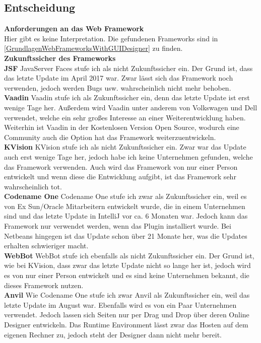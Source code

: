 \documentclass[ngerman]{article}
\begin{document}
    \subsection{Entscheidung}
    \textbf{Anforderungen an das Web Framework}\\
    Hier gibt es keine Interpretation. Die gefundenen Frameworks sind in \ref{GrundlagenWebFrameworksWithGUIDesigner} zu finden.\\
    \textbf{Zukunftssicher des Frameworks}\\
    \indent\textbf{JSF} JavaServer Faces stufe ich als nicht Zukunftssicher ein. Der Grund ist, dass das letzte Update im April 2017 war. Zwar lässt sich das Framework noch verwenden, jedoch werden Bugs usw. wahrscheinlich nicht mehr behoben.\\
    \indent\textbf{Vaadin} Vaadin stufe ich als Zukunftssicher ein, denn das letzte Update ist erst wenige Tage her. Außerdem wird Vaadin unter anderem von Volkswagen und Dell verwendet, welche ein sehr großes Interesse an einer Weiterentwicklung haben. Weiterhin ist Vaadin in der Kostenlosen Version Open Source, wodurch eine Community auch die Option hat das Framework weiterzuentwickeln.\\
    \indent\textbf{KVision} KVision stufe ich als nicht Zukunftssicher ein. Zwar war das Update auch erst wenige Tage her, jedoch habe ich keine Unternehmen gefunden, welche das Framework verwenden. Auch wird das Framework von nur einer Person entwickelt und wenn diese die Entwicklung aufgibt, ist das Framework sehr wahrscheinlich tot.\\
    \indent\textbf{Codename One} Codename One stufe ich zwar als Zukunftssicher ein, weil es von Ex Sun/Oracle Mitarbeitern entwickelt wurde, die in einem Unternehmen sind und das letzte Update in IntelliJ vor ca. 6 Monaten war. Jedoch kann das Framework nur verwendet werden, wenn das Plugin installiert wurde. Bei Netbeans hingegen ist das Update schon über 21 Monate her, was die Updates erhalten schwieriger macht.\\
    \indent\textbf{WebBot} WebBot stufe ich ebenfalls als nicht Zukunftssicher ein. Der Grund ist, wie bei KVision, dass zwar das letzte Update nicht so lange her ist, jedoch wird es von nur einer Person entwickelt und es sind keine Unternehmen bekannt, die dieses Framework nutzen.\\
    \indent\textbf{Anvil} Wie Codename One stufe ich zwar Anvil als Zukunftssicher ein, weil das letzte Update im August war. Ebenfalls wird es von ein Paar Unternehmen verwendet. Jedoch lassen sich Seiten nur per Drag und Drop über deren Online Designer entwickeln. Das Runtime Environment lässt zwar das Hosten auf dem eigenen Rechner zu, jedoch steht der Designer dann nicht mehr bereit.\\
\end{document}
